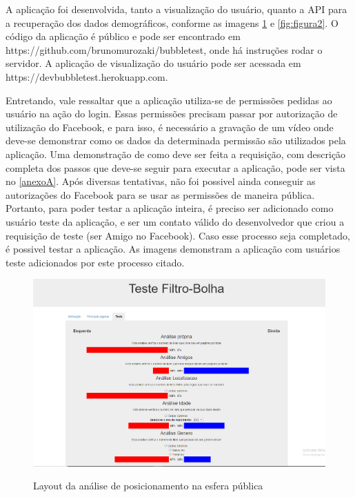 \documentclass[
	12pt,				%
	oneside,			%
	a4paper,			%
	english,			%
	brazil				%
	]{abntex2ppgsi}
\begin{document}
A aplicação foi desenvolvida, tanto a visualização do usuário, quanto a API para a recuperação dos dados demográficos, conforme as imagens \ref{fig:figura1} e \ref{fig:figura2}. O código da aplicação é público e pode ser encontrado em https://github.com/brunomurozaki/bubbletest, onde há instruções rodar o servidor. A aplicação de visualização do usuário pode ser acessada em https://devbubbletest.herokuapp.com.

Entretando, vale ressaltar que a aplicação utiliza-se de permissões pedidas ao usuário na ação do login. Essas permissões precisam passar por autorização de utilização do Facebook, e para isso, é necessário a gravação de um vídeo onde deve-se demonstrar como os dados da determinada permissão são utilizados pela aplicação. Uma demonstração de como deve ser feita a requisição, com descrição completa dos passos que deve-se seguir para executar a aplicação, pode ser vista no \ref{anexoA}. Após diversas tentativas, não foi possivel ainda conseguir as autorizações do Facebook para se usar as permissões de maneira pública. Portanto, para poder testar a aplicação inteira, é preciso ser adicionado como usuário teste da aplicação, e ser um contato válido do desenvolvedor que criou a requisição de teste (ser Amigo no Facebook). Caso esse processo seja completado, é possivel testar a aplicação. As imagens demonstram a aplicação com usuários teste adicionados por este processo citado.

\begin{figure}[H]
	\centering
	\caption{Layout da análise de posicionamento na esfera pública}
	\includegraphics[scale=0.4]{figura1.png}
	\label{fig:figura1}
\end{figure}
\end{document}
